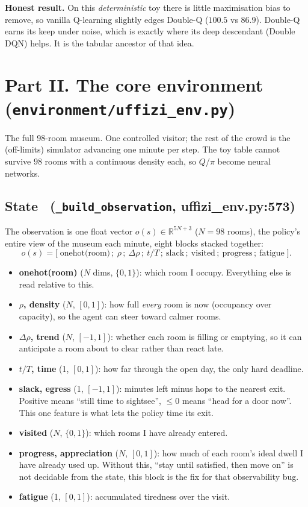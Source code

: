 \documentclass[11pt]{article}
\newcommand{\file}[1]{\texttt{\small #1}}
\newcommand{\R}{\mathbb{R}}
\begin{document}
\noindent\textbf{Honest result.} On this \emph{deterministic} toy there is little
maximisation bias to remove, so vanilla Q-learning slightly edges Double-Q
($100.5$ vs $86.9$). Double-Q earns its keep under noise, which is exactly where its
deep descendant (Double DQN) helps. It is the tabular ancestor of that idea.

\section{Part II. The core environment (\file{environment/uffizi\_env.py})}

The full 98-room museum. One controlled visitor; the rest of the crowd is the
(off-limits) simulator advancing one minute per step. The toy table cannot survive
$98$ rooms with a continuous density each, so $Q$/$\pi$ become neural networks.

\subsection{State \ (\file{\_build\_observation}, uffizi\_env.py:573)}

The observation is one float vector $o(s)\in\R^{5N+3}$ ($N=98$ rooms), the policy's
entire view of the museum each minute, eight blocks stacked together:
\[
o(s)=\big[\;\text{onehot(room)}\,;\ \rho\,;\ \Delta\rho\,;\ t/T\,;\ \text{slack}\,;\ \text{visited}\,;\ \text{progress}\,;\ \text{fatigue}\;\big].
\]
\begin{itemize}
\item \textbf{onehot(room)} ($N$ dims, $\{0,1\}$): which room I occupy. Everything else is read relative to this.
\item \textbf{$\rho$, density} ($N$, $[0,1]$): how full \emph{every} room is now (occupancy over capacity), so the agent can steer toward calmer rooms.
\item \textbf{$\Delta\rho$, trend} ($N$, $[-1,1]$): whether each room is filling or emptying, so it can anticipate a room about to clear rather than react late.
\item \textbf{$t/T$, time} (1, $[0,1]$): how far through the open day, the only hard deadline.
\item \textbf{slack, egress} (1, $[-1,1]$): minutes left minus hops to the nearest exit. Positive means ``still time to sightsee'', $\le 0$ means ``head for a door now''. This one feature is what lets the policy time its exit.
\item \textbf{visited} ($N$, $\{0,1\}$): which rooms I have already entered.
\item \textbf{progress, appreciation} ($N$, $[0,1]$): how much of each room's ideal dwell I have already used up. Without this, ``stay until satisfied, then move on'' is not decidable from the state, this block is the fix for that observability bug.
\item \textbf{fatigue} (1, $[0,1]$): accumulated tiredness over the visit.
\end{itemize}
\end{document}
